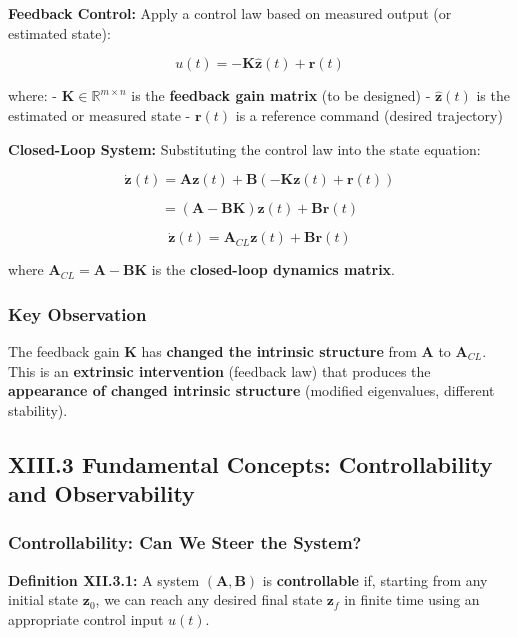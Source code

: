 \documentclass[
]{article}
\begin{document}
\textbf{Feedback Control:} Apply a control law based on measured output
(or estimated state):

\[u(t) = -\mathbf{K}\hat{\mathbf{z}}(t) + \mathbf{r}(t)\]

where: - \(\mathbf{K} \in \mathbb{R}^{m \times n}\) is the
\textbf{feedback gain matrix} (to be designed) - \(\hat{\mathbf{z}}(t)\)
is the estimated or measured state - \(\mathbf{r}(t)\) is a reference
command (desired trajectory)

\textbf{Closed-Loop System:} Substituting the control law into the state
equation:

\[\dot{\mathbf{z}}(t) = \mathbf{A}\mathbf{z}(t) + \mathbf{B}(-\mathbf{K}\mathbf{z}(t) + \mathbf{r}(t))\]

\[= (\mathbf{A} - \mathbf{BK})\mathbf{z}(t) + \mathbf{B}\mathbf{r}(t)\]

\[\boxed{\dot{\mathbf{z}}(t) = \mathbf{A}_{CL}\mathbf{z}(t) + \mathbf{B}\mathbf{r}(t)}\]

where \(\mathbf{A}_{CL} = \mathbf{A} - \mathbf{BK}\) is the
\textbf{closed-loop dynamics matrix}.

\subsubsection{Key Observation}\label{key-observation}

The feedback gain \(\mathbf{K}\) has \textbf{changed the intrinsic
structure} from \(\mathbf{A}\) to \(\mathbf{A}_{CL}\). This is an
\textbf{extrinsic intervention} (feedback law) that produces the
\textbf{appearance of changed intrinsic structure} (modified
eigenvalues, different stability).

\subsection{XIII.3 Fundamental Concepts: Controllability and
Observability}\label{xiii.3-fundamental-concepts-controllability-and-observability}

\subsubsection{Controllability: Can We Steer the
System?}\label{controllability-can-we-steer-the-system}

\textbf{Definition XII.3.1:} A system \((\mathbf{A}, \mathbf{B})\) is
\textbf{controllable} if, starting from any initial state
\(\mathbf{z}_0\), we can reach any desired final state \(\mathbf{z}_f\)
in finite time using an appropriate control input \(u(t)\).
\end{document}
